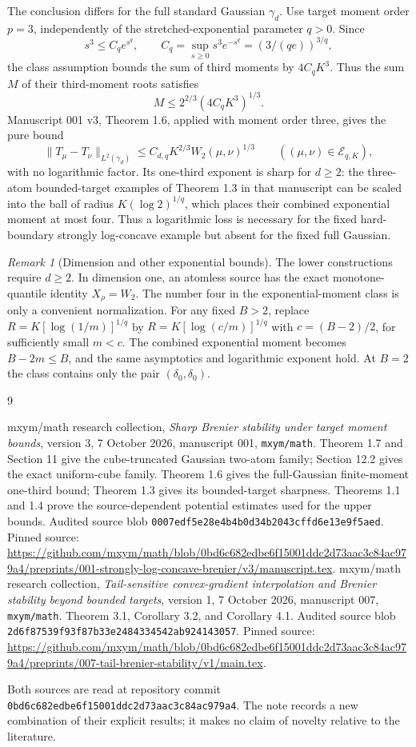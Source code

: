 \documentclass[11pt]{article}
\theoremstyle{remark}\newtheorem{remark}[theorem]{Remark}
\newcommand{\norm}[1]{\lVert#1\rVert}
\begin{document}
The conclusion differs for the full standard Gaussian $\gamma_d$.
Use target moment order $p=3$, independently of the stretched-exponential
parameter $q>0$. Since
\[
 s^3\le C_q e^{s^q},\qquad
 C_q=\sup_{s\ge0}s^3e^{-s^q}=(3/(qe))^{3/q},
\]
the class assumption bounds the sum of third moments by $4C_qK^3$.
Thus the sum $M$ of their third-moment roots satisfies
\[
 M\le2^{2/3}(4C_qK^3)^{1/3}.
\]
Manuscript 001 v3, Theorem 1.6, applied with moment order three,
gives the pure bound
\[
 \norm{T_\mu-T_\nu}_{L^2(\gamma_d)}
 \le C_{d,q}K^{2/3}W_2(\mu,\nu)^{1/3}
 \qquad ((\mu,\nu)\in\mathcal E_{q,K}),
\]
with no logarithmic factor. Its one-third exponent is sharp for
$d\ge2$: the three-atom bounded-target examples of Theorem 1.3 in
that manuscript can be scaled into the ball of radius
$K(\log2)^{1/q}$, which places their combined exponential moment
at most four. Thus a logarithmic loss is necessary for the fixed
hard-boundary strongly log-concave example but absent for the fixed
full Gaussian.

\begin{remark}[Dimension and other exponential bounds]
The lower constructions require $d\ge2$. In dimension one, an
atomless source has the exact monotone-quantile identity
$X_\rho=W_2$. The number four in the exponential-moment class is
only a convenient normalization. For any fixed $B>2$, replace
$R=K[\log(1/m)]^{1/q}$ by
$R=K[\log(c/m)]^{1/q}$ with $c=(B-2)/2$, for sufficiently small
$m<c$. The combined exponential moment becomes $B-2m\le B$,
and the same asymptotics and logarithmic exponent hold. At $B=2$
the class contains only the pair $(\delta_0,\delta_0)$.
\end{remark}

\begin{thebibliography}{9}
\raggedright
{}
mxym/math research collection, \emph{Sharp Brenier stability under target moment bounds},
version 3, 7 October 2026, manuscript 001, \texttt{mxym/math}.
Theorem 1.7 and Section 11 give the cube-truncated Gaussian
two-atom family; Section 12.2 gives the exact uniform-cube family.
Theorem 1.6 gives the full-Gaussian finite-moment one-third bound;
Theorem 1.3 gives its bounded-target sharpness. Theorems 1.1 and 1.4
prove the source-dependent potential estimates used for the upper bounds.
Audited source blob
\texttt{0007edf5e28e4b4b0d34b2043cffd6e13e9f5aed}.
Pinned source:
\url{https://github.com/mxym/math/blob/0bd6c682edbe6f15001ddc2d73aac3c84ac979a4/preprints/001-strongly-log-concave-brenier/v3/manuscript.tex}.
mxym/math research collection, \emph{Tail-sensitive convex-gradient interpolation and
Brenier stability beyond bounded targets}, version 1,
7 October 2026, manuscript 007, \texttt{mxym/math}.
Theorem 3.1, Corollary 3.2, and Corollary 4.1.
Audited source blob \texttt{2d6f87539f93f87b33e2484334542ab924143057}.
Pinned source:
\url{https://github.com/mxym/math/blob/0bd6c682edbe6f15001ddc2d73aac3c84ac979a4/preprints/007-tail-brenier-stability/v1/main.tex}.
\end{thebibliography}
\noindent Both sources are read at repository commit
\texttt{0bd6c682edbe6f15001ddc2d73aac3c84ac979a4}.
The note records a new combination of their explicit results;
it makes no claim of novelty relative to the literature.
\end{document}
